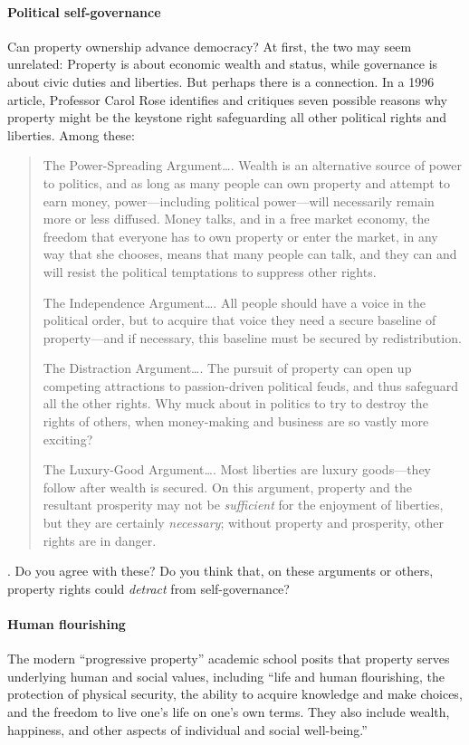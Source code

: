 \paragraph{Political self-governance}
Can property ownership advance democracy? At first, the two may seem unrelated:
Property is about economic wealth and status, while governance is about civic
duties and liberties. But perhaps there is a connection. In a 1996 article,
Professor Carol Rose identifies and critiques seven possible reasons why
property might be the keystone right safeguarding all other political rights and
liberties. Among these:
\begin{quote}
The Power-Spreading Argument\ldots. Wealth is an alternative source of power
to politics, and as long as many people can own property and attempt to earn
money, power---including political power---will necessarily remain more or less
diffused. Money talks, and in a free market economy, the freedom that everyone
has to own property or enter the market, in any way that she chooses, means that
many people can talk, and they can and will resist the political temptations to
suppress other rights.

The Independence Argument\ldots. All people should have a voice in the
political order, but to acquire that voice they need a secure baseline of
property---and if necessary, this baseline must be secured by redistribution.

The Distraction Argument\ldots. The pursuit of property can open up competing
attractions to passion-driven political feuds, and thus safeguard all the other
rights. Why muck about in politics to try to destroy the rights of others, when
money-making and business are so vastly more exciting?

The Luxury-Good Argument\ldots. Most liberties are luxury goods---they follow
after wealth is secured. On this argument, property and the resultant prosperity
may not be \emph{sufficient} for the enjoyment of liberties, but they are
certainly \emph{necessary}; without property and prosperity, other rights are in
danger.
\end{quote}
. Do you agree with these? Do you think that, on these
arguments or others, property rights could \emph{detract} from self-governance?


\paragraph{Human flourishing}
The modern ``progressive property'' academic school posits that property serves
underlying human and social values, including ``life and human flourishing, the
protection of physical security, the ability to acquire knowledge and make
choices, and the freedom to live one's life on one's own terms. They also
include wealth, happiness, and other aspects of individual and social
well-being.''

